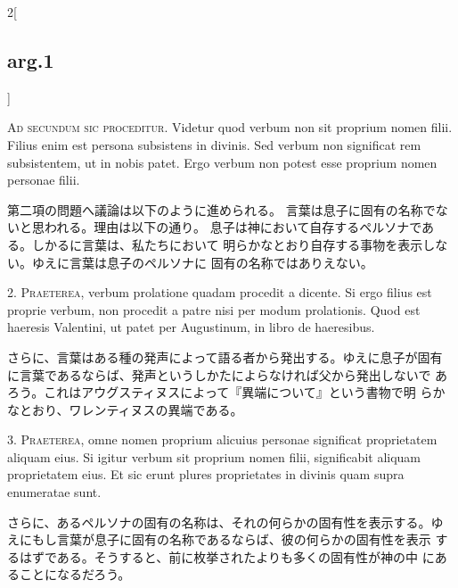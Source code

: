 \documentclass[paper=a4paper,fontsize=10pt,jafontsize=9pt,titlepage]{jlreq}
\begin{document}
\begin{paracol}{2}[\subsection{arg.1}]

{\scshape Ad secundum sic proceditur}. Videtur quod verbum non sit proprium nomen
filii. Filius enim est persona subsistens in divinis. Sed verbum non
significat rem subsistentem, ut in nobis patet. Ergo verbum non potest
esse proprium nomen personae filii.

\switchcolumn

第二項の問題へ議論は以下のように進められる。
言葉は息子に固有の名称でないと思われる。理由は以下の通り。
息子は神において自存するペルソナである。しかるに言葉は、私たちにおいて
 明らかなとおり自存する事物を表示しない。ゆえに言葉は息子のペルソナに
 固有の名称ではありえない。


2. {\scshape Praeterea}, verbum prolatione quadam procedit a dicente. Si ergo filius
est proprie verbum, non procedit a patre nisi per modum
prolationis. Quod est haeresis Valentini, ut patet per Augustinum, in
libro de haeresibus.

\switchcolumn

さらに、言葉はある種の発声によって語る者から発出する。ゆえに息子が固有
 に言葉であるならば、発声というしかたによらなければ父から発出しないで
 あろう。これはアウグスティヌスによって『異端について』という書物で明
 らかなとおり、ワレンティヌスの異端である。


3. {\scshape Praeterea}, omne nomen proprium alicuius personae significat
proprietatem aliquam eius. Si igitur verbum sit proprium nomen filii,
significabit aliquam proprietatem eius. Et sic erunt plures
proprietates in divinis quam supra enumeratae sunt.

\switchcolumn

さらに、あるペルソナの固有の名称は、それの何らかの固有性を表示する。ゆ
 えにもし言葉が息子に固有の名称であるならば、彼の何らかの固有性を表示
 するはずである。そうすると、前に枚挙されたよりも多くの固有性が神の中
 にあることになるだろう。


\end{paracol}
\end{document}
